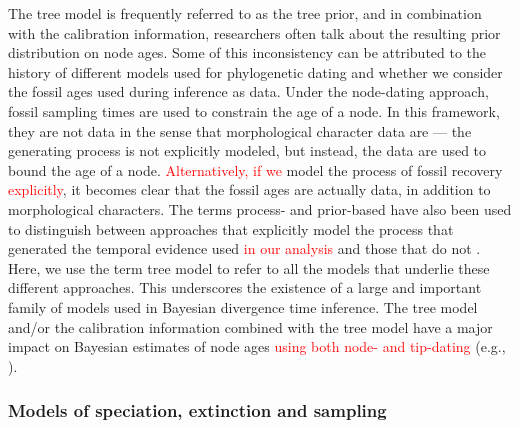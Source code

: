 \documentclass[11pt]{article}
\newcommand{\edit}[1]{{\textcolor{red}{#1}}} %
\begin{document}
The tree model is frequently referred to as the tree prior, and in combination with the calibration information, researchers often talk about the resulting prior distribution on node ages.
Some of this inconsistency can be attributed to the history of different models used for phylogenetic dating and whether we consider the fossil ages used during inference as data.
Under the node-dating approach, fossil sampling times are used to constrain the age of a node.
In this framework, they are not data in the sense that morphological character data are --- the generating process is not explicitly modeled, but instead, the data are used to bound the age of a node.
\edit{Alternatively, if we} model the process of fossil recovery  \edit{explicitly}, it becomes clear that the fossil ages are actually data, in addition to  morphological characters.
The terms process- and prior-based have also been used to distinguish between approaches that explicitly model the  process that generated the temporal evidence used  \edit{in our analysis} and those that do not \cite{Landis2016}. 
Here, we use the term tree model to refer to all the models that underlie these different approaches.
This  underscores the existence of a large and important family of models used in Bayesian divergence time inference.
 The tree model and/or the calibration information combined with the tree model have a major impact on Bayesian estimates of node ages \edit{using both node- and tip-dating} (e.g., \cite{Ho2009,Warnock2011,OReilly2015,matzke2016,Matschiner2017}).

\subsubsection{Models of speciation, extinction and sampling}
\end{document}
